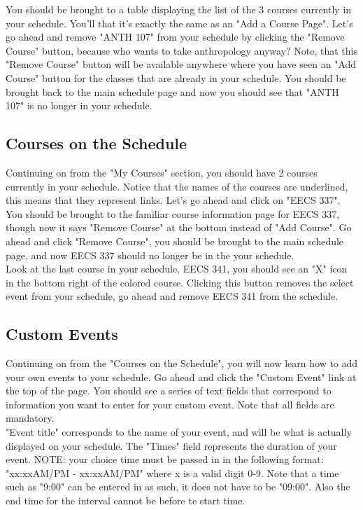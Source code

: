 \documentclass[pdftex,12pt,letter]{article}
\begin{document}
You should be brought to a table displaying the list of the 3 courses currently in your schedule. You'll that it's exactly the same as an "Add a Course Page". Let's go ahead and remove "ANTH 107" from your schedule by clicking the "Remove Course" button, because who wants to take anthropology anyway? Note, that this "Remove Course" button will be available anywhere where you have seen an "Add Course" button for the classes that are already in your schedule. You should be brought back to the main schedule page and now you should see that "ANTH 107" is no longer in your schedule.\\

\subsection{Courses on the Schedule}
Continuing on from the "My Courses" section, you should have 2 courses currently in your schedule. Notice that the names of the courses are underlined, this means that they represent links. Let's go ahead and click on "EECS 337". You should be brought to the familiar course information page for EECS 337, though now it says "Remove Course" at the bottom instead of "Add Course". Go ahead and click "Remove Course", you should be brought to the main schedule page, and now EECS 337 should no longer be in the your schedule.\\

Look at the last course in your schedule, EECS 341, you should see an "X" icon in the bottom right of the colored course. Clicking this button removes the select event from your schedule, go ahead and remove EECS 341 from the schedule.

\subsection{Custom Events}
Continuing on from the "Courses on the Schedule", you will now learn how to add your own events to your schedule. Go ahead and click the "Custom Event" link at the top of the page. You should see a series of text fields that correspond to information you want to enter for your custom event. Note that all fields are mandatory.\\

"Event title" corresponds to the name of your event, and will be what is actually displayed on your schedule. The "Times" field represents the duration of your event. NOTE: your choice time must be passed in in the following format: "xx:xxAM/PM - xx:xxAM/PM" where x is a valid digit 0-9. Note that a time such as "9:00" can be entered in as such, it does not have to be "09:00". Also the end time for the interval cannot be before te start time.\\
\end{document}
